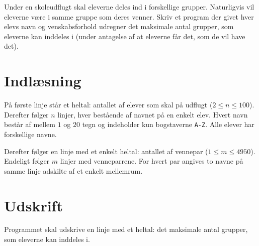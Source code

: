 
Under en skoleudflugt skal eleverne deles ind i forskellige grupper.
Naturligvis vil eleverne være i samme gruppe som deres venner.
Skriv et program der givet hver elevs navn og venskabsforhold udregner det maksimale antal grupper, som eleverne kan inddeles i (under antagelse af at eleverne får det, som de vil have det).

\section*{Indlæsning}

På første linje står et heltal: antallet af elever som skal på udflugt ($2 \le n \le 100$).
Derefter følger $n$ linjer, hver bestående af navnet på en enkelt elev.
Hvert navn består af mellem $1$ og $20$ tegn og indeholder kun bogstaverne \texttt{A-Z}.
Alle elever har forskellige navne.

Derefter følger en linje med et enkelt heltal: antallet af vennepar ($1 \le m \le 4950$).
Endeligt følger $m$ linjer med venneparrene.
For hvert par angives to navne på samme linje adskilte af et enkelt mellemrum.

\section*{Udskrift}
Programmet skal udskrive en linje med et heltal: det maksimale antal grupper, som eleverne kan inddeles i.
